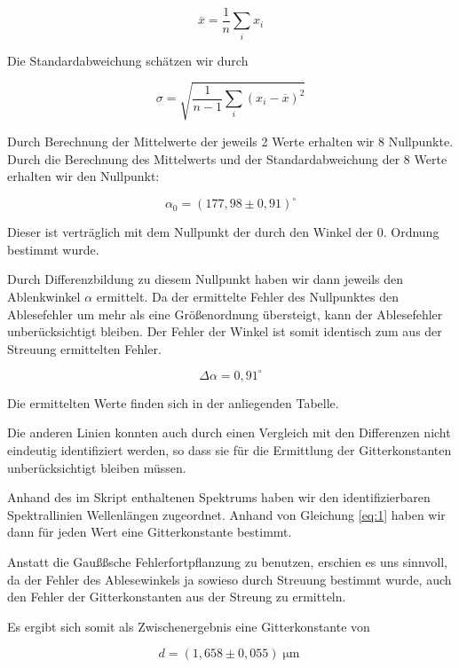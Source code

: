 \documentclass[a4paper,german,12pt,smallheadings]{scrartcl}
\begin{document}
\begin{equation}
  \overline{x} = \frac{1}{n} \sum_i x_i
\end{equation}

Die Standardabweichung schätzen wir durch

\begin{equation}
  \sigma = \sqrt{\frac{1}{n-1} \sum_i (x_i - \overline{x})^2}
\end{equation}

Durch Berechnung der Mittelwerte der jeweils 2 Werte erhalten wir 8 Nullpunkte.
Durch die Berechnung des Mittelwerts und der Standardabweichung der 8 Werte
erhalten wir den Nullpunkt:

\begin{equation*}
  \alpha_0 = (177{,}98\pm0{,}91)^\circ
\end{equation*}

Dieser ist verträglich mit dem Nullpunkt der durch den Winkel der 0. Ordnung
bestimmt wurde.

Durch Differenzbildung zu diesem Nullpunkt haben wir dann jeweils den
Ablenkwinkel $\alpha$ ermittelt. Da der ermittelte Fehler des Nullpunktes den
Ablesefehler um mehr als eine Größenordnung übersteigt, kann der Ablesefehler
unberücksichtigt bleiben. Der Fehler der Winkel ist somit identisch zum aus der
Streuung ermittelten Fehler.

\begin{equation*}
  \Delta \alpha = 0{,}91^\circ
\end{equation*}

Die ermittelten Werte finden sich in der anliegenden Tabelle.

Die anderen Linien konnten auch durch einen Vergleich mit den Differenzen nicht
eindeutig identifiziert werden, so dass sie für die Ermittlung der
Gitterkonstanten unberücksichtigt bleiben müssen.

Anhand des im Skript enthaltenen Spektrums haben wir den identifizierbaren
Spektrallinien Wellenlängen zugeordnet. Anhand von Gleichung \ref{eq:1} haben
wir dann für jeden Wert eine Gitterkonstante bestimmt.

Anstatt die Gaußßsche Fehlerfortpflanzung zu benutzen, erschien es uns
sinnvoll, da der Fehler des Ablesewinkels ja sowieso durch Streuung bestimmt
wurde, auch den Fehler der Gitterkonstanten aus der Streung zu ermitteln.

Es ergibt sich somit als Zwischenergebnis eine Gitterkonstante von

\begin{equation*}
  d = (1{,}658\pm0{,}055) \operatorname{\mu m}
\end{equation*}
\end{document}
